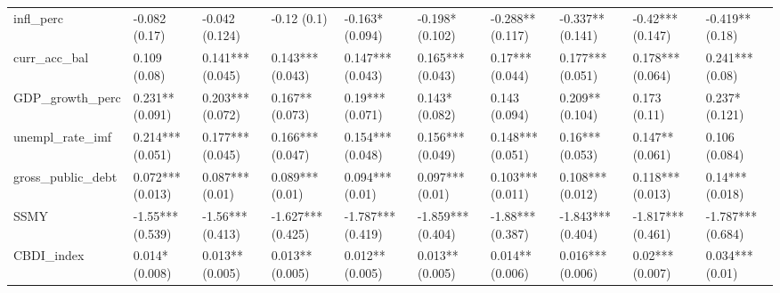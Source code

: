 \begin{table}[H]
\begin{adjustbox}{totalheight=2.5in, width=\columnwidth }
\begin{subtable}[c]{1\textwidth}
{\begin{tabular}{llllllllll}
  infl\_perc & -0.082 (0.17) & -0.042 (0.124) & -0.12 (0.1) & -0.163* (0.094) & -0.198* (0.102) & -0.288** (0.117) & -0.337** (0.141) & -0.42*** (0.147) & -0.419** (0.18) \\ 
  curr\_acc\_bal & 0.109 (0.08) & 0.141*** (0.045) & 0.143*** (0.043) & 0.147*** (0.043) & 0.165*** (0.043) & 0.17*** (0.044) & 0.177*** (0.051) & 0.178*** (0.064) & 0.241*** (0.08) \\ 
  GDP\_growth\_perc & 0.231** (0.091) & 0.203*** (0.072) & 0.167** (0.073) & 0.19*** (0.071) & 0.143* (0.082) & 0.143 (0.094) & 0.209** (0.104) & 0.173 (0.11) & 0.237* (0.121) \\ 
  unempl\_rate\_imf & 0.214*** (0.051) & 0.177*** (0.045) & 0.166*** (0.047) & 0.154*** (0.048) & 0.156*** (0.049) & 0.148*** (0.051) & 0.16*** (0.053) & 0.147** (0.061) & 0.106 (0.084) \\ 
  gross\_public\_debt & 0.072*** (0.013) & 0.087*** (0.01) & 0.089*** (0.01) & 0.094*** (0.01) & 0.097*** (0.01) & 0.103*** (0.011) & 0.108*** (0.012) & 0.118*** (0.013) & 0.14*** (0.018) \\ 
  SSMY & -1.55*** (0.539) & -1.56*** (0.413) & -1.627*** (0.425) & -1.787*** (0.419) & -1.859*** (0.404) & -1.88*** (0.387) & -1.843*** (0.404) & -1.817*** (0.461) & -1.787*** (0.684) \\ 
  CBDI\_index & 0.014* (0.008) & 0.013** (0.005) & 0.013** (0.005) & 0.012** (0.005) & 0.013** (0.005) & 0.014** (0.006) & 0.016*** (0.006) & 0.02*** (0.007) & 0.034*** (0.01) \\ 
   \bottomrule
\end{tabular}}



\end{subtable}
\end{adjustbox}
\end{table}
